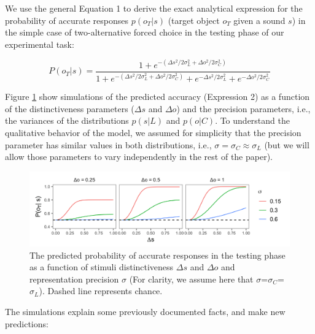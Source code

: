 \documentclass[10pt, letterpaper]{article}
\newenvironment{CodeChunk}{}{}
\begin{document}
We use the general Equation 1 to derive the exact analytical expression
for the probability of accurate responses \(p(o_T | s)\) (target object
\(o_T\) given a sound \(s\)) in the simple case of two-alternative
forced choice in the testing phase of our experimental task:

\begin{equation}
P(o_T|s)= \frac{1 + e^{-(\Delta s^2/2\sigma_L^2+ \Delta o^2/2\sigma_C^2)}}{1 + e^{-(\Delta s^2/2\sigma_L^2+ \Delta o^2/2\sigma_C^2)}+ e^{-\Delta s^2 /2\sigma_L^2} + e^{-\Delta o^2 /2\sigma_C^2 }}
\end{equation}

Figure \ref{fig:simulation} show simulations of the predicted accuracy
(Expression 2) as a function of the distinctiveness parameters
(\(\Delta s\) and \(\Delta o\)) and the precision parameters, i.e., the
variances of the distributions \(p(s| L)\) and \(p(o | C)\). To
understand the qualitative behavior of the model, we assumed for
simplicity that the precision parameter has similar values in both
distributions, i.e., \(\sigma =\sigma_C \approx \sigma_L\) (but we will
allow those parameters to vary independently in the rest of the paper).

\begin{CodeChunk}
\begin{figure}[h]

{\centering \includegraphics{figs/simulation-1} 

}

\caption{\label{fig:simulation}The predicted probability of accurate responses in the testing phase as a function of stimuli distinctiveness $\Delta s$ and $\Delta o$ and representation precision $\sigma$ (For clarity, we assume here that $\sigma$=$\sigma_C$=$\sigma_L$). Dashed line represents chance.}\label{fig:simulation}
\end{figure}
\end{CodeChunk}

The simulations explain some previously documented facts, and make new
predictions:
\end{document}
